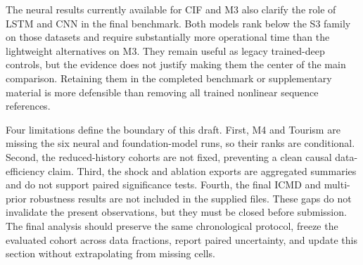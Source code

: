 The neural results currently available for CIF and M3 also clarify the role of
LSTM and CNN in the final benchmark. Both models rank below the S3 family on
those datasets and require substantially more operational time than the
lightweight alternatives on M3. They remain useful as legacy trained-deep
controls, but the evidence does not justify making them the center of the main
comparison. Retaining them in the completed benchmark or supplementary material
is more defensible than removing all trained nonlinear sequence references.

Four limitations define the boundary of this draft. First, M4 and Tourism are
missing the six neural and foundation-model runs, so their ranks are
conditional. Second, the reduced-history cohorts are not fixed, preventing a
clean causal data-efficiency claim. Third, the shock and ablation exports are
aggregated summaries and do not support paired significance tests. Fourth, the
final ICMD and multi-prior robustness results are not included in the supplied
files. These gaps do not invalidate the present observations, but they must be
closed before submission. The final analysis should preserve the same
chronological protocol, freeze the evaluated cohort across data fractions,
report paired uncertainty, and update this section without extrapolating from
missing cells.

\FloatBarrier
